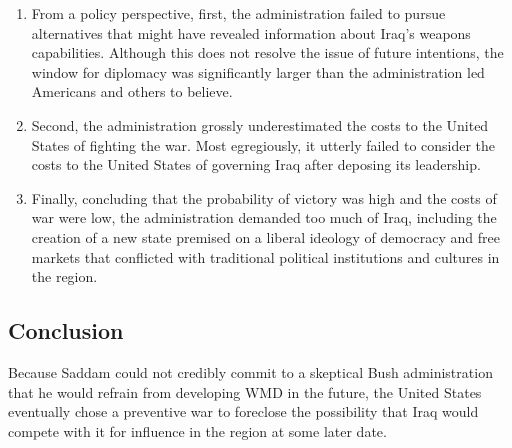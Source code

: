 \begin{enumerate}
    \item From a policy perspective, first, the administration failed to pursue alternatives that might have revealed information about Iraq's weapons capabilities. Although this does not resolve the issue of future intentions, the window for diplomacy was significantly larger than the administration led Americans and others to believe.

    \item Second, the administration grossly underestimated the costs to the United States of fighting the war. Most egregiously, it utterly failed to consider the costs to the United States of governing Iraq after deposing its leadership.

    \item Finally, concluding that the probability of victory was high and the costs of war were low, the administration demanded too much of Iraq, including the creation of a new state premised on a liberal ideology of democracy and free markets that conflicted with traditional political institutions and cultures in the region.
\end{enumerate}

\subsection{Conclusion}
Because Saddam could not credibly commit to a skeptical Bush administration that he would refrain from developing WMD in the future, the United States eventually chose a preventive war to foreclose the possibility that Iraq would compete with it for influence in the region at some later date.

